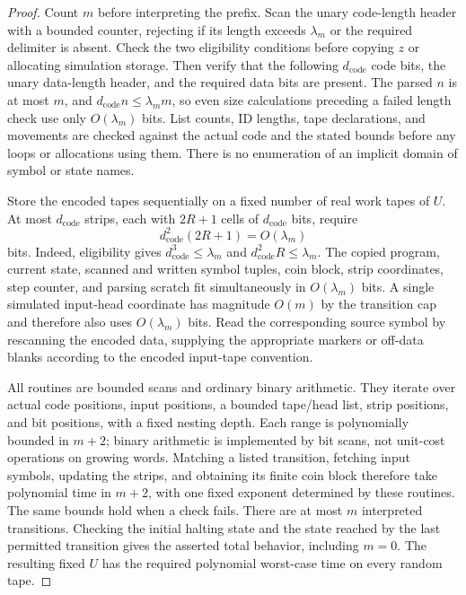 \begin{proof}
Count $m$ before interpreting the prefix.  Scan the unary code-length
header with a bounded counter, rejecting if its length exceeds
$\lambda_m$ or the required delimiter is absent.  Check the two
eligibility conditions before copying $z$ or allocating simulation
storage.  Then verify that the following $d_{\mathrm{code}}$ code bits,
the unary data-length header, and the required data bits are present.
The parsed $n$ is at most $m$, and
$d_{\mathrm{code}}n\le\lambda_m m$, so even size calculations preceding
a failed length check use only $O(\lambda_m)$ bits.  List counts, ID
lengths, tape declarations, and movements are checked against the actual
code and the stated bounds before any loops or allocations using them.
There is no enumeration of an implicit domain of symbol or state names.

Store the encoded tapes sequentially on a fixed number of real work
tapes of $U$.  At most $d_{\mathrm{code}}$ strips, each with $2R+1$
cells of $d_{\mathrm{code}}$ bits, require
\begin{equation}\label{eq:compiler-interpreter-space}
 d_{\mathrm{code}}^2(2R+1)=O(\lambda_m)
\end{equation}
bits.  Indeed, eligibility gives
$d_{\mathrm{code}}^3\le\lambda_m$ and
$d_{\mathrm{code}}^2R\le\lambda_m$.
The copied program, current state, scanned and written symbol tuples,
coin block, strip coordinates, step counter, and parsing scratch fit
simultaneously in $O(\lambda_m)$ bits.  A single simulated input-head
coordinate has magnitude $O(m)$ by the transition cap and therefore
also uses $O(\lambda_m)$ bits.  Read the corresponding source symbol
by rescanning the encoded data, supplying the appropriate markers or
off-data blanks according to the encoded input-tape convention.

All routines are bounded scans and ordinary binary arithmetic.  They
iterate over actual code positions, input positions, a bounded tape/head
list, strip positions, and bit positions, with a fixed nesting depth.
Each range is polynomially bounded in $m+2$; binary arithmetic is
implemented by bit scans, not unit-cost operations on growing words.
Matching a listed transition, fetching input symbols, updating the
strips, and obtaining its finite coin block therefore take polynomial
time in $m+2$, with one fixed exponent determined by these routines.
The same bounds hold when a check fails.  There are at most $m$
interpreted transitions.  Checking the initial halting state and the
state reached by the last permitted transition gives the asserted
total behavior, including $m=0$.  The resulting fixed $U$ has the
required polynomial worst-case time on every random tape.
\end{proof}

